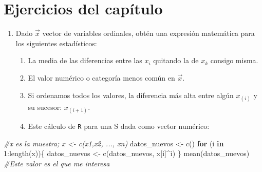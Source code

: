 \documentclass[
]{book}
\newenvironment{Shaded}{\begin{snugshade}}{\end{snugshade}}
\newcommand{\CommentTok}[1]{\textcolor[rgb]{0.56,0.35,0.01}{\textit{#1}}}
\newcommand{\ControlFlowTok}[1]{\textcolor[rgb]{0.13,0.29,0.53}{\textbf{#1}}}
\newcommand{\DecValTok}[1]{\textcolor[rgb]{0.00,0.00,0.81}{#1}}
\newcommand{\FunctionTok}[1]{\textcolor[rgb]{0.00,0.00,0.00}{#1}}
\newcommand{\NormalTok}[1]{#1}
\newcommand{\OtherTok}[1]{\textcolor[rgb]{0.56,0.35,0.01}{#1}}
\newcommand{\SpecialCharTok}[1]{\textcolor[rgb]{0.00,0.00,0.00}{#1}}
\providecommand{\tightlist}{%
  \setlength{\itemsep}{0pt}\setlength{\parskip}{0pt}}
\begin{document}
\hypertarget{ejercicios-del-capuxedtulo}{%
\section{Ejercicios del capítulo}\label{ejercicios-del-capuxedtulo}}

\begin{enumerate}
\def\labelenumi{\arabic{enumi}.}
\tightlist
\item
  Dado \(\vec{x}\) vector de variables ordinales, obtén una expresión matemática para los siguientes estadísticos:

  \begin{enumerate}
  \def\labelenumii{\alph{enumii}.}
  \tightlist
  \item
    La media de las diferencias entre las \(x_i\) quitando la de \(x_k\) consigo misma.
  \item
    El valor numérico o categoría menos común en \(\vec{x}\).
  \item
    Si ordenamos todos los valores, la diferencia más alta entre algún \(x_{(i)}\) y su sucesor: \(x_{(i+1)}\).
  \item
    Este cálculo de \texttt{R} para una S dada como vector numérico:
  \end{enumerate}
\end{enumerate}

\begin{Shaded}
\begin{Highlighting}[]
\CommentTok{\#x es la muestra; x \textless{}{-} c(x1,x2, ..., xn)}
\NormalTok{datos\_nuevos }\OtherTok{\textless{}{-}} \FunctionTok{c}\NormalTok{()}
\ControlFlowTok{for}\NormalTok{ (i }\ControlFlowTok{in} \DecValTok{1}\SpecialCharTok{:}\FunctionTok{length}\NormalTok{(x))\{}
\NormalTok{    datos\_nuevos }\OtherTok{\textless{}{-}} \FunctionTok{c}\NormalTok{(datos\_nuevos, x[i]}\SpecialCharTok{\^{}}\NormalTok{i)}
\NormalTok{\}}
\FunctionTok{mean}\NormalTok{(datos\_nuevos) }\CommentTok{\#Este valor es el que me interesa}
\end{Highlighting}
\end{Shaded}
\end{document}
